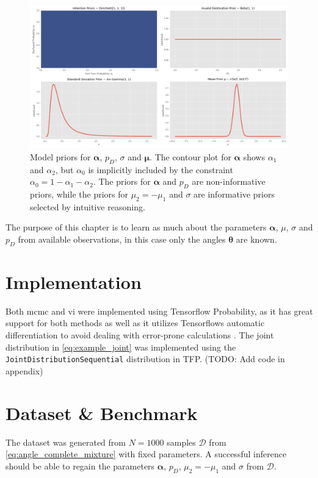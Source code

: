 \begin{figure}
    \centering
    \includegraphics[width=1\textwidth]{figures/priors.png}
    \caption{Model priors for $\boldsymbol{\alpha}$, $p_D$, $\sigma$ and $\boldsymbol{\mu}$. The contour plot for $\boldsymbol{\alpha}$ shows $\alpha_1$ and $\alpha_2$, but $\alpha_0$ is implicitly included by the constraint $\alpha_0 = 1 - \alpha_1 - \alpha_2$. The priors for $\boldsymbol{\alpha}$ and $p_D$ are non-informative priors, while the priors for $\mu_2 = -\mu_1$ and $\sigma$ are informative priors selected by intuitive reasoning.}
    \label{fig:priors}
\end{figure}

The purpose of this chapter is to learn as much about the parameters $\boldsymbol{\alpha}$, $\mu$, $\sigma$ and $p_D$ from available observations, in this case only the angles $\boldsymbol{\theta}$ are known. 

\section{Implementation}
Both \acrshort{mcmc} and \acrshort{vi} were implemented using Tensorflow Probability, as it has great support for both methods as well as it utilizes Tensorflows automatic differentiation to avoid dealing with error-prone calculations \cite{tensorflow2015-whitepaper}. The joint distribution in \cref{eq:example_joint} was implemented using the \texttt{JointDistributionSequential} distribution in TFP. (TODO: Add code in appendix)


\section{Dataset \& Benchmark}
The dataset was generated from $N=1000$ samples $\boldsymbol{\mathcal{D}}$ from \cref{eq:angle_complete_mixture} with fixed parameters. A successful inference should be able to regain the parameters $\boldsymbol{\alpha}$, $p_D$, $\mu_2 = -\mu_1$ and $\sigma$ from $\mathcal{D}$.


